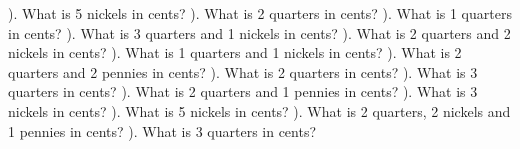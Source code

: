 \documentclass{article}%
\begin{document}
). What is 5 nickels in cents?%
\newline%
\newline%
). What is 2 quarters in cents?%
\newline%
\newline%
). What is 1 quarters in cents?%
\newline%
\newline%
). What is 3 quarters and 1 nickels in cents?%
\newline%
\newline%
). What is 2 quarters and 2 nickels in cents?%
\newline%
\newline%
). What is 1 quarters and 1 nickels in cents?%
\newline%
\newline%
). What is 2 quarters and 2 pennies in cents?%
\newline%
\newline%
). What is 2 quarters in cents?%
\newline%
\newline%
). What is 3 quarters in cents?%
\newline%
\newline%
). What is 2 quarters and 1 pennies in cents?%
\newline%
\newline%
). What is 3 nickels in cents?%
\newline%
\newline%
). What is 5 nickels in cents?%
\newline%
\newline%
). What is 2 quarters, 2 nickels and 1 pennies in cents?%
\newline%
\newline%
). What is 3 quarters in cents?%
\newline%
\end{document}
